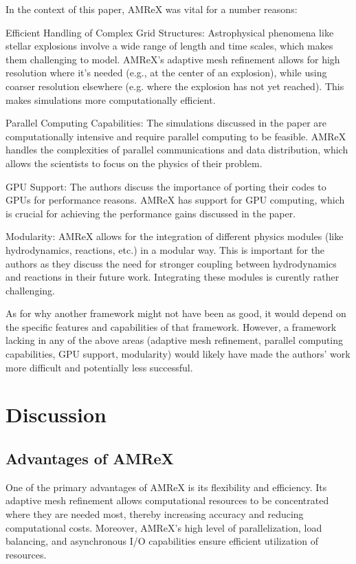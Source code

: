 \documentclass[12pt, a4paper]{scrartcl}
\begin{document}
In the context of this paper, AMReX was vital for a number reasons:

Efficient Handling of Complex Grid Structures: Astrophysical phenomena like stellar explosions involve a wide 
range of length and time scales, which makes them challenging to model. AMReX's adaptive mesh refinement allows 
for high resolution where it's needed (e.g., at the center of an explosion), while using coarser resolution elsewhere (e.g. where the explosion has not yet reached). 
This makes simulations more computationally efficient.

Parallel Computing Capabilities: The simulations discussed in the paper are computationally intensive and require 
parallel computing to be feasible. AMReX handles the complexities of parallel communications and data distribution, 
which allows the scientists to focus on the physics of their problem.

GPU Support: The authors discuss the importance of porting their codes to GPUs for performance reasons. AMReX has 
support for GPU computing, which is crucial for achieving the performance gains discussed in the paper.

Modularity: AMReX allows for the integration of different physics modules (like hydrodynamics, reactions, etc.) in a 
modular way. This is important for the authors as they discuss the need for stronger coupling between hydrodynamics 
and reactions in their future work. Integrating these modules is curently rather challenging.

As for why another framework might not have been as good, it would depend on the specific features and capabilities 
of that framework. However, a framework lacking in any of the above areas (adaptive mesh refinement, parallel 
computing capabilities, GPU support, modularity) would likely have made the authors' work more difficult and 
potentially less successful.


\section{Discussion}
\subsection{Advantages of AMReX}

One of the primary advantages of AMReX is its flexibility and efficiency. Its adaptive mesh 
refinement allows computational resources to be concentrated where they are needed most, thereby 
increasing accuracy and reducing computational costs. Moreover, AMReX's high level of 
parallelization, load balancing, and asynchronous I/O capabilities ensure efficient 
utilization of resources.
\end{document}
